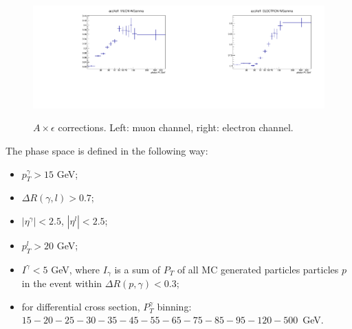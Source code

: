\begin{figure}[htb]
  \begin{center}
  \includegraphics[width=0.5\textwidth]{../figs/figs_v11/MUON_WGamma/Constants/C_accXeff_MUON_WGamma.pdf}\includegraphics[width=0.5\textwidth]{../figs/figs_v11/ELECTRON_WGamma/Constants/C_accXeff_ELECTRON_WGamma.pdf}\\
  \label{fig:covMatricesaccXeff_Wg}
  \caption{$A\times\epsilon$ corrections. Left: muon channel, right: electron channel.}
  \end{center}
\end{figure}


The phase space is defined in the following way:
  \begin{itemize}
  \item $p_T^{\gamma}>15$ GeV;
  \item $\Delta{R}(\gamma,l) > 0.7$;
  \item $|\eta^{\gamma}|<2.5$, $|\eta^{l}|<2.5$;
  \item $p_T^{l}>20$ GeV;
  \item $I^{\gamma}<5$ GeV, where $I_{\gamma}$ is a sum of $P_T$ of all MC generated particles particles $p$ in the event within $\Delta{R(p,\gamma)}<0.3$;
  \item for differential cross section, $P_T^{\gamma}$ binning: $15-20-25-30-35-45-55-65-75-85-95-120-500$~GeV.
  \end{itemize}

